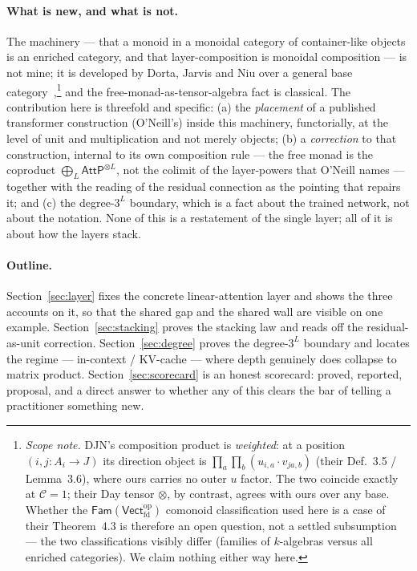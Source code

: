 \documentclass[11pt]{article}
\newcommand{\Vect}{\mathsf{Vect}}
\newcommand{\Fam}{\mathsf{Fam}}
\newcommand{\AttP}{\mathsf{AttP}}
\theoremstyle{plain}
\theoremstyle{definition}
\begin{document}
\paragraph{What is new, and what is not.} The machinery --- that a monoid in a monoidal category
of container-like objects is an enriched category, and that layer-composition is monoidal
composition --- is not mine; it is developed by Dorta, Jarvis and Niu over a general base
category~\cite[Thm.~4.3]{djn},\footnote{\emph{Scope note.} DJN's composition product is
\emph{weighted}: at a position $(i,j\colon A_i\to J)$ its direction object is
$\prod_a\prod_b(u_{i,a}\cdot v_{ja,b})$ (their Def.~3.5 / Lemma~3.6), where ours carries no outer $u$
factor. The two coincide exactly at $\mathcal C=1$; their Day tensor $\otimes$, by contrast, agrees
with ours over any base. Whether the $\Fam(\Vect_{\mathrm{fd}}^{\mathrm{op}})$ comonoid
classification used here is a case of their Theorem~4.3 is therefore an open question, not a settled
subsumption --- the two classifications visibly differ (families of $k$-algebras versus all enriched
categories). We claim nothing either way here.} and the free-monad-as-tensor-algebra fact is classical. The
contribution here is threefold and specific: (a) the \emph{placement} of a published transformer
construction (O'Neill's) inside this machinery, functorially, at the level of unit and
multiplication and not merely objects; (b) a \emph{correction} to that construction, internal to
its own composition rule --- the free monad is the coproduct $\bigoplus_L\AttP^{\otimes L}$, not the
colimit of the layer-powers that O'Neill names --- together with the reading of the residual
connection as the pointing that repairs it; and (c) the degree-$3^L$ boundary, which is a fact
about the trained network, not about the notation. None of this is a restatement of the single
layer; all of it is about how the layers stack.

\paragraph{Outline.} Section~\ref{sec:layer} fixes the concrete linear-attention layer and shows
the three accounts on it, so that the shared gap and the shared wall are visible on one example.
Section~\ref{sec:stacking} proves the stacking law and reads off the residual-as-unit correction.
Section~\ref{sec:degree} proves the degree-$3^L$ boundary and locates the regime --- in-context /
KV-cache --- where depth genuinely does collapse to matrix product. Section~\ref{sec:scorecard}
is an honest scorecard: proved, reported, proposal, and a direct answer to whether any of this
clears the bar of telling a practitioner something new.
\end{document}
